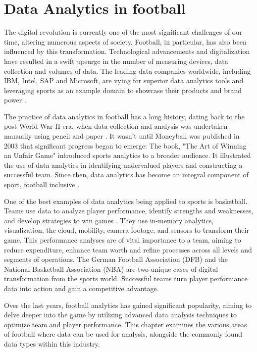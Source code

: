 \documentclass[twoside,nohyper]{tufte-book}
\begin{document}
\hypertarget{data-analytics-in-football-1}{%
\chapter{Data Analytics in football}\label{data-analytics-in-football-1}}

The digital revolution is currently one of the most significant
challenges of our time, altering numerous aspects of society. Football,
in particular, has also been influenced by this transformation.
Technological advancements and digitalization have resulted in a swift
upsurge in the number of measuring devices, data collection and volumes
of data. The leading data companies worldwide, including IBM, Intel, SAP
and Microsoft, are vying for superior data analytics tools and
leveraging sports as an example domain to showcase their products and
brand power \citep{1}.

The practice of data analytics in football has a long history, dating
back to the post-World War II era, when data collection and analysis was
undertaken manually using pencil and paper \citep{1}. It wasn't until
Moneyball was published in 2003 that significant progress began to
emerge: The book, "The Art of Winning an Unfair Game" introduced
sports analytics to a broader audience. It illustrated the use of data
analytics in identifying undervalued players and constructing a
successful team. Since then, data analytics has become an integral
component of sport, football inclusive \citep{1}.

One of the best examples of data analytics being applied to sports is
basketball. Teams use data to analyze player performance, identify
strengths and weaknesses, and develop strategies to win games \citep{2}. They
use in-memory analytics, visualization, the cloud, mobility, camera
footage, and sensors to transform their game. This performance analyses
are of vital importance to a team, aiming to reduce expenditure, enhance
team worth and refine processes across all levels and segments of
operations. The German Football Association (DFB) and the National
Basketball Association (NBA) are two unique cases of digital
transformation from the sports world. Successful teams turn player
performance data into action and gain a competitive advantage.

Over the last years, football analytics has gained significant
popularity, aiming to delve deeper into the game by utilizing advanced
data analysis techniques to optimize team and player performance. This
chapter examines the various areas of football where data can be used
for analysis, alongside the commonly found data types within this
industry.
\end{document}

